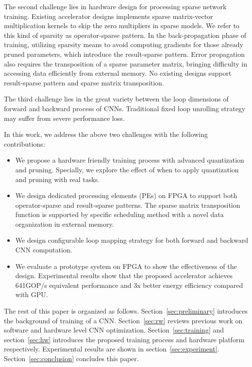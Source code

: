 The second challenge lies in hardware design for processing sparse network training. Existing accelerator designs implements sparse matrix-vector multiplication kernels to skip the zero multipliers in sparse models. We refer to this kind of sparsity as operator-sparse pattern. In the back-propagation phase of training, utilizing sparsity means to avoid computing gradients for those already pruned parameters, which introduce the result-sparse pattern. Error propagation also requires the transposition of a sparse parameter matrix, bringing difficulty in accessing data efficiently from external memory. No existing designs support result-sparse pattern and sparse matrix transposition.

The third challenge lies in the great variety between the loop dimensions of forward and backward process of CNNs. Traditional fixed loop unrolling strategy may suffer from severe performance loss. 

In this work, we address the above two challenges with the following contributions:

\begin{itemize}
  \item We propose a hardware friendly training process with advanced quantization and pruning. Specially, we explore the effect of when to apply quantization and pruning with real tasks.
  \item We design dedicated processing elements (PEs) on FPGA to support both operator-sparse and result-sparse patterns. The sparse matrix transposition function is supported by specific scheduling method with a novel data organization in external memory.
  \item We design configurable loop mapping strategy for both forward and backward CNN computation. 
  \item We evaluate a prototype system on FPGA to show the effectiveness of the design. Experimental results show that the proposed accelerator achieves 641GOP/s equivalent performance and 3x better energy efficiency compared with GPU.
\end{itemize}

The rest of this paper is organized as follows. Section~\ref{sec:preliminary} introduces the background of training of a CNN. Section~\ref{sec:rw} reviews previous work on software and hardware level CNN optimization. Section~\ref{sec:training} and section~\ref{sec:hw} introduces the proposed training process and hardware platform respectively. Experimental results are shown in section~\ref{sec:experiment}. Section~\ref{sec:conclusion} concludes this paper.
